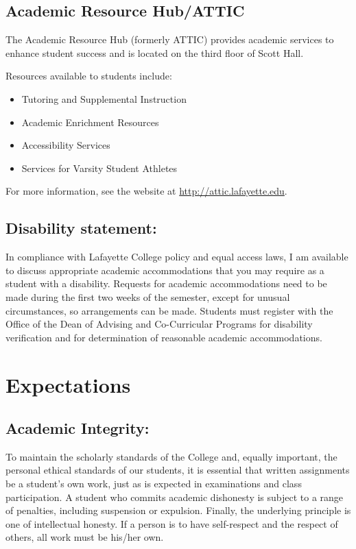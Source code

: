 \documentclass[10pt]{amsart}
\begin{document}
\subsection*{Academic Resource Hub/ATTIC}
\noindent
The Academic Resource Hub (formerly ATTIC) provides academic services to enhance student success and is located on the third floor of Scott Hall.

Resources available to students include:
\begin{itemize}
\item 
  Tutoring and Supplemental Instruction
\item
  Academic Enrichment Resources
\item
  Accessibility Services
\item
  Services for Varsity Student Athletes
\end{itemize}
For more information, see the website at \url{http://attic.lafayette.edu}.

\subsection*{Disability statement:}
In compliance with Lafayette College policy and equal access laws, I am available to discuss appropriate academic accommodations that you may require as a student with a disability.  Requests for academic accommodations need to be made during the first two weeks of the semester, except for unusual circumstances, so arrangements can be made.  Students must register with the Office of the Dean of Advising and Co-Curricular Programs for disability verification and for determination of reasonable academic accommodations.


\section*{Expectations}
\noindent
\subsection*{Academic Integrity:}
To maintain the scholarly standards of the College and, equally important, the personal ethical standards of our students, it is essential that written assignments be a student’s own work, just as is expected in examinations and class participation. A student who commits academic dishonesty is subject to a range of penalties, including suspension or expulsion. Finally, the underlying principle is one of intellectual honesty. If a person is to have self-respect and the respect of others, all work must be his/her own.
\end{document}
